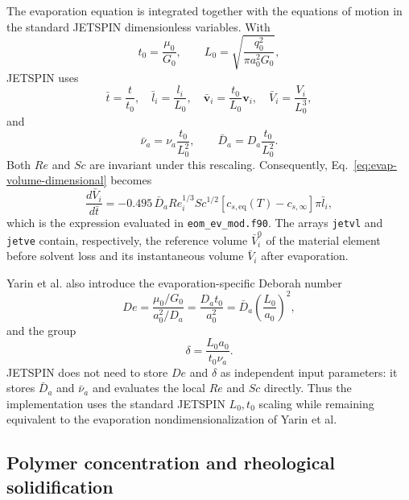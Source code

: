 The evaporation equation is integrated together with the equations of
motion in the standard JETSPIN dimensionless variables.  With
\begin{equation}
 t_0=\frac{\mu_0}{G_0},
 \qquad
 L_0=\sqrt{\frac{q_0^2}{\pi a_0^2G_0}},
\end{equation}
JETSPIN uses
\begin{equation}
 \bar t=\frac{t}{t_0},\quad
 \bar l_i=\frac{l_i}{L_0},\quad
 \bar{\mathbf v}_i=\frac{t_0}{L_0}\mathbf v_i,\quad
 \bar V_i=\frac{V_i}{L_0^3},
\end{equation}
and
\begin{equation}
 \bar\nu_a=\nu_a\frac{t_0}{L_0^2},
 \qquad
 \bar D_a=D_a\frac{t_0}{L_0^2}.
\end{equation}
Both $Re$ and $Sc$ are invariant under this rescaling.  Consequently,
Eq.~\ref{eq:evap-volume-dimensional} becomes
\begin{equation}
 \frac{d\bar V_i}{d\bar t}=
 -0.495\,\bar D_a Re_i^{1/3}Sc^{1/2}
 \left[c_{s,\mathrm{eq}}(T)-c_{s,\infty}\right]\pi\bar l_i,
 \label{eq:evap-volume-dimensionless}
\end{equation}
which is the expression evaluated in \texttt{eom\_ev\_mod.f90}.
The arrays \texttt{jetvl} and \texttt{jetve} contain, respectively,
the reference volume $\bar V_i^0$ of the material element before solvent
loss and its instantaneous volume $\bar V_i$ after evaporation.

Yarin et al. also introduce the evaporation-specific Deborah number
\begin{equation}
 De=\frac{\mu_0/G_0}{a_0^2/D_a}
   =\frac{D_a t_0}{a_0^2}
   =\bar D_a\left(\frac{L_0}{a_0}\right)^2,
 \label{eq:evap-deborah}
\end{equation}
and the group
\begin{equation}
 \delta=\frac{L_0a_0}{t_0\nu_a}.
 \label{eq:evap-delta}
\end{equation}
JETSPIN does not need to store $De$ and $\delta$ as independent input
parameters: it stores $\bar D_a$ and $\bar\nu_a$ and evaluates the local
$Re$ and $Sc$ directly.  Thus the implementation uses the standard
JETSPIN $L_0,t_0$ scaling while remaining equivalent to the evaporation
nondimensionalization of Yarin et al.

\subsection{Polymer concentration and rheological solidification}

